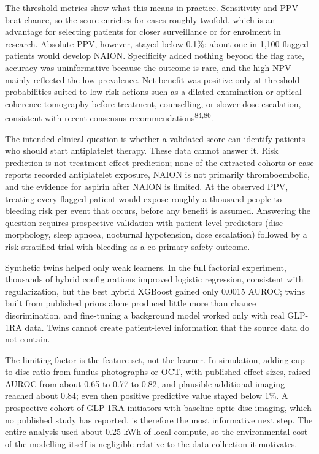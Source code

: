\documentclass[
  11pt,
]{article}
\begin{document}
The threshold metrics show what this means in practice. Sensitivity and
PPV beat chance, so the score enriches for cases roughly twofold, which
is an advantage for selecting patients for closer surveillance or for
enrolment in research. Absolute PPV, however, stayed below 0.1\%: about
one in 1,100 flagged patients would develop NAION. Specificity added
nothing beyond the flag rate, accuracy was uninformative because the
outcome is rare, and the high NPV mainly reflected the low prevalence.
Net benefit was positive only at threshold probabilities suited to
low-risk actions such as a dilated examination or optical coherence
tomography before treatment, counselling, or slower dose escalation,
consistent with recent consensus recommendations\textsuperscript{84,86}.

The intended clinical question is whether a validated score can identify
patients who should start antiplatelet therapy. These data cannot answer
it. Risk prediction is not treatment-effect prediction; none of the
extracted cohorts or case reports recorded antiplatelet exposure, NAION
is not primarily thromboembolic, and the evidence for aspirin after
NAION is limited. At the observed PPV, treating every flagged patient
would expose roughly a thousand people to bleeding risk per event that
occurs, before any benefit is assumed. Answering the question requires
prospective validation with patient-level predictors (disc morphology,
sleep apnoea, nocturnal hypotension, dose escalation) followed by a
risk-stratified trial with bleeding as a co-primary safety outcome.

Synthetic twins helped only weak learners. In the full factorial
experiment, thousands of hybrid configurations improved logistic
regression, consistent with regularization, but the best hybrid XGBoost
gained only 0.0015 AUROC; twins built from published priors alone
produced little more than chance discrimination, and fine-tuning a
background model worked only with real GLP-1RA data. Twins cannot create
patient-level information that the source data do not contain.

The limiting factor is the feature set, not the learner. In simulation,
adding cup-to-disc ratio from fundus photographs or OCT, with published
effect sizes, raised AUROC from about 0.65 to 0.77 to 0.82, and
plausible additional imaging reached about 0.84; even then positive
predictive value stayed below 1\%. A prospective cohort of GLP-1RA
initiators with baseline optic-disc imaging, which no published study
has reported, is therefore the most informative next step. The entire
analysis used about 0.25 kWh of local compute, so the environmental cost
of the modelling itself is negligible relative to the data collection it
motivates.
\end{document}
